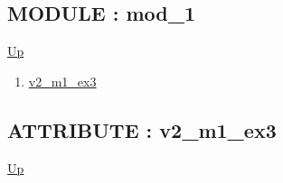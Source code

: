 \subsection*{MODULE : mod\_1}
\hypertarget{ecldoc:Inintest.Example_3.mod_1}{}
\par
\begin{minipage}[t]{\textwidth}
\begin{flushleft}
  
\end{flushleft}
\end{minipage}
\hyperlink{ecldoc:Inintest.Example_3}{Up} \\
\par
\par
\begin{enumerate}
\item \hyperlink{ecldoc:inintest.example_3.mod_1.v2_m1_ex3}{v2\_m1\_ex3}
\end{enumerate}
\subsection*{ATTRIBUTE : v2\_m1\_ex3}
\hypertarget{ecldoc:inintest.example_3.mod_1.v2_m1_ex3}{}
\par
\begin{minipage}[t]{\textwidth}
\begin{flushleft}
  
\end{flushleft}
\end{minipage}
\hyperlink{ecldoc:Inintest.Example_3.mod_1}{Up} \\
\par
\par



